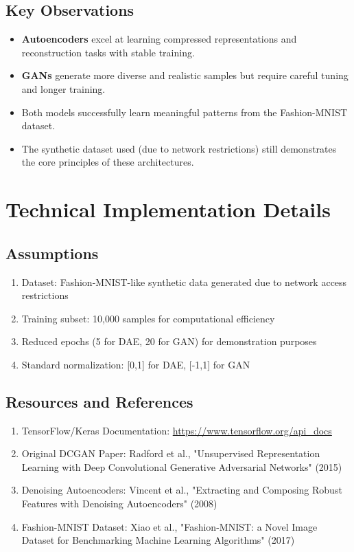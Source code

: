 \documentclass[11pt,a4paper]{article}
\begin{document}
\subsection{Key Observations}

\begin{itemize}
    \item \textbf{Autoencoders} excel at learning compressed representations and reconstruction tasks with stable training.
    \item \textbf{GANs} generate more diverse and realistic samples but require careful tuning and longer training.
    \item Both models successfully learn meaningful patterns from the Fashion-MNIST dataset.
    \item The synthetic dataset used (due to network restrictions) still demonstrates the core principles of these architectures.
\end{itemize}

\section{Technical Implementation Details}

\subsection{Assumptions}

\begin{enumerate}
    \item Dataset: Fashion-MNIST-like synthetic data generated due to network access restrictions
    \item Training subset: 10,000 samples for computational efficiency
    \item Reduced epochs (5 for DAE, 20 for GAN) for demonstration purposes
    \item Standard normalization: [0,1] for DAE, [-1,1] for GAN
\end{enumerate}

\subsection{Resources and References}

\begin{enumerate}
    \item TensorFlow/Keras Documentation: \url{https://www.tensorflow.org/api_docs}
    \item Original DCGAN Paper: Radford et al., "Unsupervised Representation Learning with Deep Convolutional Generative Adversarial Networks" (2015)
    \item Denoising Autoencoders: Vincent et al., "Extracting and Composing Robust Features with Denoising Autoencoders" (2008)
    \item Fashion-MNIST Dataset: Xiao et al., "Fashion-MNIST: a Novel Image Dataset for Benchmarking Machine Learning Algorithms" (2017)
\end{enumerate}
\end{document}
